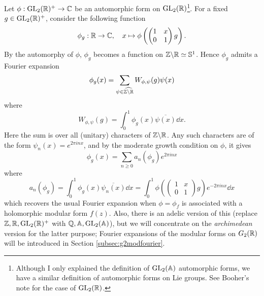 Let $\phi: \mathrm{GL}_2(\mathbb{R})^+ \to \mathbb{C}$ be an automorphic form on $\mathrm{GL}_2(\mathbb{R})$\footnote{Although I only explained the definition of $\mathrm{GL}_2(\mathbb{A})$ automorphic forms, we have a similar definition of automorphic forms on Lie groups. See Booher's note \cite{booher} for the case of $\mathrm{GL}_2(\mathbb{R})$.}.
For a fixed $g \in \mathrm{GL}_2(\mathbb{R})^+$, consider the following function
$$
\phi_g: \mathbb{R} \to \mathbb{C}, \quad  x \mapsto \phi\left(\begin{pmatrix}
    1 & x \\ 0 & 1
\end{pmatrix} g\right).
$$
By the automorphy of $\phi$, $\phi_g$ becomes a function on $\mathbb{Z} \backslash \mathbb{R} \simeq \mathbb{S}^1$.
Hence $\phi_g$ admits a Fourier expansion
$$
    \phi_g(x) = \sum_{\psi \in \widehat{\mathbb{Z} \backslash \mathbb{R}}} W_{\phi, \psi}(g) \psi(x)
$$
where
$$
    W_{\phi, \psi}(g) = \int_{0}^{1} \phi_g(x) \overline{\psi(x)} \dd x.
$$
Here the sum is over all (unitary) characters of $\mathbb{Z} \backslash \mathbb{R}$.
Any such characters are of the form $\psi_n(x) = e^{2 \pi i n x}$, and by the moderate growth condition on $\phi$, it gives
$$
\phi_g(x) = \sum_{n \ge 0} a_n(\phi_g) e^{2 \pi i n x}
$$
where
$$
    a_{n}(\phi_g) = \int_{0}^{1} \phi_g(x) \overline{\psi_n(x)} \dd x = \int_{0}^{1} \phi\left(\begin{pmatrix}
        1 & x \\ 0 & 1
    \end{pmatrix}g\right) e^{-2 \pi i n x} \dd x
$$
which recovers the usual Fourier expansion when $\phi = \phi_f$ is associated with a holomorphic modular form $f(z)$.
Also, there is an adelic version of this (replace $\mathbb{Z}, \mathbb{R}, \mathrm{GL}_2(\mathbb{R})^+$ with $\mathbb{Q}, \mathbb{A}, \mathrm{GL}_2(\mathbb{A})$), but we will concentrate on the \emph{archimedean} version for the latter purpose;  Fourier expansions of the modular forms on $G_2(\mathbb{R})$ will be introduced in Section \ref{subsec:g2modfourier}.

